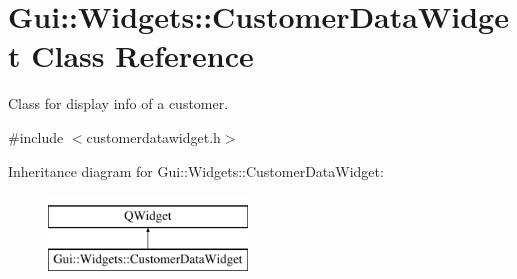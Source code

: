 \hypertarget{classGui_1_1Widgets_1_1CustomerDataWidget}{\section{Gui\-:\-:Widgets\-:\-:Customer\-Data\-Widget Class Reference}
\label{classGui_1_1Widgets_1_1CustomerDataWidget}
}


Class for display info of a customer.  




{\ttfamily \#include $<$customerdatawidget.\-h$>$}

Inheritance diagram for Gui\-:\-:Widgets\-:\-:Customer\-Data\-Widget\-:\begin{figure}[H]
\begin{center}
\leavevmode
\includegraphics[height=2.000000cm]{df/deb/classGui_1_1Widgets_1_1CustomerDataWidget}
\end{center}
\end{figure}
